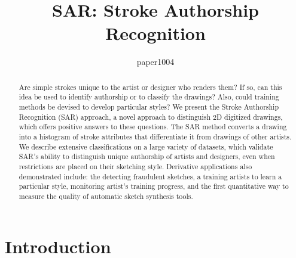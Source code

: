 \documentclass{egpubl}
\title[SAR: Stroke Authorship Recognition]%
      {SAR: Stroke Authorship Recognition}
\author[paper1004]
     {paper1004}
\begin{document}

\maketitle

\begin{abstract}
Are simple strokes unique to the artist or designer who renders them? If so, can this idea be used to identify authorship or to classify the drawings? Also, could training methods be devised to develop particular styles? We present the Stroke Authorship Recognition (SAR) approach, a novel approach to distinguish 2D digitized drawings, which offers positive answers to these questions.  The SAR method converts a drawing into a histogram of stroke attributes that differentiate it from drawings of other artists. We describe extensive classifications on a large variety of datasets, which validate SAR's ability to distinguish unique authorship of artists and designers, even when restrictions are placed on their sketching style. Derivative applications also demonstrated include: the detecting fraudulent sketches, a training artists to learn a particular style, monitoring artist's training progress, and the first quantitative way to measure the quality of automatic sketch synthesis tools.\vspace{-1mm}
\end{abstract}
\vspace{-5mm}
\section{Introduction}
\vspace{-2mm}

\end{document}
